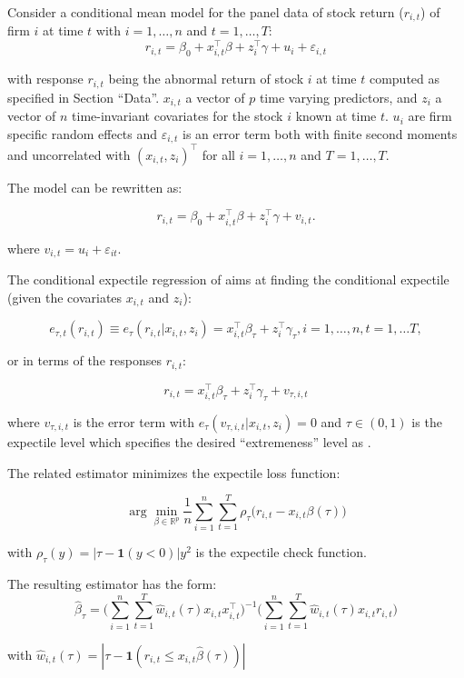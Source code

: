 \documentclass[]{article}
\begin{document}
Consider a conditional mean model for the panel data of stock return (\(r_{i,t}\)) of firm \(i\) at time \(t\) with \(i=1,\ldots,n\) and \(t=1,\ldots, T\):
\[r_{i,t} = \beta_0 + x_{i,t}^\top\beta + z_{i}^\top\gamma + u_{i} + \varepsilon_{i,t}\]

with response \(r_{i,t}\) being the abnormal return of stock \(i\) at time \(t\) computed as specified in Section ``Data''. \(x_{i,t}\) a vector of \(p\) time varying predictors, and \(z_i\) a vector of \(n\) time-invariant covariates for the stock \(i\) known at time \(t\). \(u_{i}\) are firm specific random effects and \(\varepsilon_{i,t}\) is an error term both with finite second moments and uncorrelated with \((x_{i,t}, z_{i})^\top\) for all \(i=1, \dots,n\) and \(T=1, \ldots,T\).

The model can be rewritten as:

\[r_{i,t} = \beta_0 + x_{i,t}^\top\beta + z_{i}^\top\gamma+v_{i,t}.\]

where \(v_{i,t} = u_{i} + \varepsilon_{it}\).

The conditional expectile regression of \cite{Newey1987} aims at finding the conditional expectile (given the covariates \(x_{i,t}\) and \(z_i\)):

\[e_{\tau,t}(r_{i,t})\equiv e_\tau(r_{i,t}|x_{i,t},z_i) = x_{i,t}^\top \beta_\tau + z_{i}^\top \gamma_\tau, i=1,\ldots, n, t=1,\ldots T,\]

or in terms of the responses \(r_{i,t}\):

\[r_{i,t} = x_{i,t}^\top \beta_\tau + z_{i}^\top \gamma_\tau + v_{\tau,i,t}\]

where \(v_{\tau,i,t}\) is the error term with \(e_\tau(v_{\tau,i,t}|x_{i,t},z_i)=0\) and \(\tau\in (0,1)\) is the expectile level which specifies the desired ``extremeness'' level as \cite{Kneib2013}.

The related estimator minimizes the expectile loss function:

\[\arg\min_{\beta\in\mathbb R^p}\frac 1n\sum_{i=1}^n\sum_{t=1}^T\rho_\tau\Big(r_{i,t} - x_{i,t}\beta(\tau)\Big)\]

with \(\rho_\tau(y)=|\tau - \mathbf 1(y<0)|y^2\) is the expectile check function.

The resulting estimator has the form:
\[\hat\beta_\tau = \Big(\sum_{i=1}^n\sum_{t=1}^T\hat w_{i,t} (\tau)x_{i,t}x_{i,t}^\top\Big)^{-1}\Big(\sum_{i=1}^n\sum_{t=1}^T\hat w_{i,t} (\tau)x_{i,t}r_{i,t}\Big)\]

with \(\hat w_{i,t}(\tau) = |\tau - \mathbf 1(r_{i,t}\leq x_{i,t}\hat\beta(\tau))|\)
\end{document}
